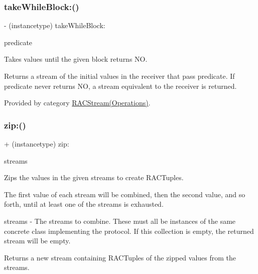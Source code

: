\subsubsection{\texorpdfstring{take\+While\+Block\+:()}{takeWhileBlock:()}\hspace{0.1cm}{\footnotesize\ttfamily [3/3]}}
{\footnotesize\ttfamily -\/ (instancetype) take\+While\+Block\+: \begin{DoxyParamCaption}\item[{(B\+O\+OL($^\wedge$)(id x))}]{predicate }\end{DoxyParamCaption}}

Takes values until the given block returns {\ttfamily NO}.

Returns a stream of the initial values in the receiver that pass {\ttfamily predicate}. If {\ttfamily predicate} never returns {\ttfamily NO}, a stream equivalent to the receiver is returned. 

Provided by category \mbox{\hyperlink{category_r_a_c_stream_07_operations_08_ae3b27f126fffcf5dfb8eaa6bd71c5fc4}{R\+A\+C\+Stream(\+Operations)}}.

\mbox{\label{interface_r_a_c_stream_a90ef5f217dc285dc831cc0d45166a529}} 
\subsubsection{\texorpdfstring{zip\+:()}{zip:()}\hspace{0.1cm}{\footnotesize\ttfamily [1/3]}}
{\footnotesize\ttfamily + (instancetype) zip\+: \begin{DoxyParamCaption}\item[{(id$<$ N\+S\+Fast\+Enumeration $>$)}]{streams }\end{DoxyParamCaption}}

Zips the values in the given streams to create R\+A\+C\+Tuples.

The first value of each stream will be combined, then the second value, and so forth, until at least one of the streams is exhausted.

streams -\/ The streams to combine. These must all be instances of the same concrete class implementing the protocol. If this collection is empty, the returned stream will be empty.

Returns a new stream containing R\+A\+C\+Tuples of the zipped values from the streams. 

